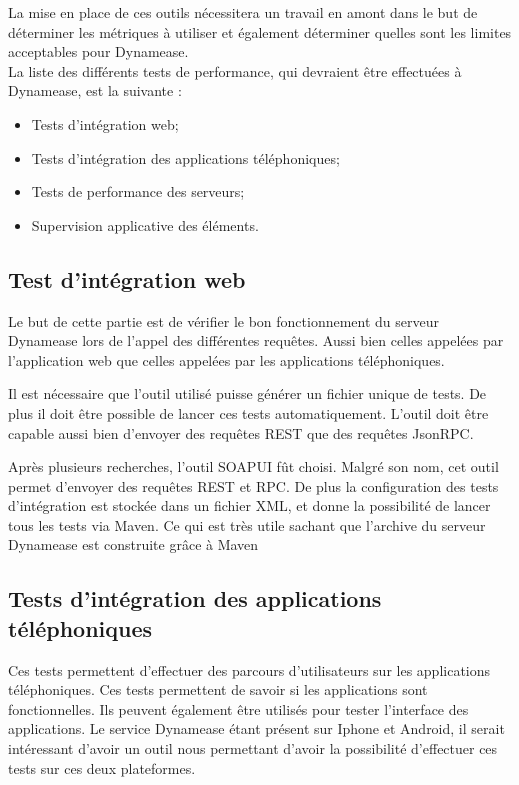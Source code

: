 La mise en place de ces outils nécessitera un travail en amont dans le but de déterminer les métriques à utiliser et également déterminer quelles sont les limites acceptables pour Dynamease.\\

La liste des différents tests de performance, qui devraient être effectuées à Dynamease, est la suivante :

\begin{itemize}
	\item Tests d'intégration web;
	\item Tests d'intégration des applications téléphoniques;
	\item Tests de performance des serveurs;
	\item Supervision applicative des éléments.
\end{itemize}

\subsection{Test d'intégration web}

Le but de cette partie est de vérifier le bon fonctionnement du serveur Dynamease lors de l'appel des différentes requêtes. Aussi bien celles appelées par l'application web que celles appelées par les applications téléphoniques.

Il est nécessaire que l'outil utilisé puisse générer un fichier unique de tests. De plus il doit être possible de lancer ces tests automatiquement. L'outil doit être capable aussi bien d'envoyer des requêtes REST que des requêtes JsonRPC.

Après plusieurs recherches, l'outil SOAPUI fût choisi. Malgré son nom, cet outil permet d'envoyer des requêtes REST et RPC. De plus la configuration des tests d'intégration est stockée dans un fichier XML, et donne la possibilité de lancer tous les tests via Maven. Ce qui est très utile sachant que l'archive du serveur Dynamease est construite grâce à Maven

\subsection{Tests d'intégration des applications téléphoniques}

Ces tests permettent d'effectuer des parcours d'utilisateurs sur les applications téléphoniques. Ces tests permettent de savoir si les applications sont fonctionnelles. Ils peuvent également être utilisés pour tester l'interface des applications. Le service Dynamease étant présent sur Iphone et Android, il serait intéressant d'avoir un outil nous permettant d'avoir la possibilité d'effectuer ces tests sur ces deux plateformes. 

